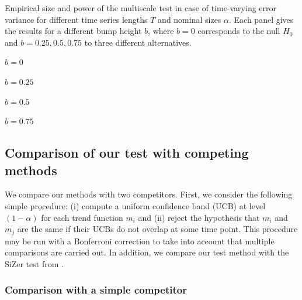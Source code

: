 \documentclass[12pt]{article}
\begin{document}
\begin{table}[t!]
\renewcommand{\arraystretch}{1.2}  
\footnotesize{
\begin{center}
\caption{Empirical size and power of the multiscale test in case of time-varying error variance for different time series lengths $T$ and nominal sizes $\alpha$. Each panel gives the results for a different bump height $b$, where $b = 0$ corresponds to the null $H_0$ and $b = 0.25,0.5,0.75$ to three different alternatives.}\label{tab:sizepower:SV}
\begin{subtable}[b]{0.4\textwidth}
\centering  
\caption{$b=0$}

\end{subtable}
\begin{subtable}[b]{0.4\textwidth}
\centering  
\caption{$b=0.25$}

\end{subtable}
\begin{subtable}[b]{0.4\textwidth}
\centering  
\vspace{0.25cm} \caption{$b=0.5$}

\end{subtable}
\begin{subtable}[b]{0.4\textwidth}
\centering  
\vspace{0.25cm} \caption{$b=0.75$}

\end{subtable}
\end{center}}
\end{table}

\subsection{Comparison of our test with competing methods}


We compare our methods with two competitors. First, we consider the following simple procedure:  (i) compute a uniform confidence band (UCB) at level $(1-\alpha)$ for each trend function $m_i$ and (ii) reject the hypothesis that $m_i$ and $m_j$ are the same if their UCBs do not overlap at some time point. This procedure may be run with a Bonferroni correction to take into account that multiple comparisons are carried out. In addition, we compare our test method with the SiZer test from \cite{Park2009}. 


\subsubsection{Comparison with a simple competitor} 
\end{document}
